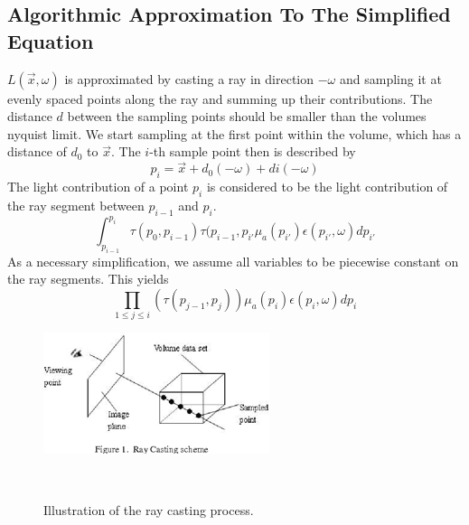 \subsection{Algorithmic Approximation To The Simplified Equation}
$L(\vec{x},\omega )$ is approximated by casting a ray in direction $-\omega$ and sampling it at evenly spaced points along the ray and summing up their contributions. The distance $d$ between the sampling points should be smaller than the volumes nyquist limit.
We start sampling at the first point within the volume, which has a distance of $d_0$ to $\vec{x}$. The $i$-th sample point then is described by
\begin{equation}
p_i=\vec{x} + d_0(-\omega) + di(-\omega)
\end{equation}
The light contribution of a point $p_i$ is considered to be the light contribution of the ray segment between $p_{i-1}$ and $p_i$.
\begin{equation}
\int_{p_{i-1}}^{p_i} \tau (p_0,p_{i-1}) \tau(p_{i-1},p_{i'} \mu_a(p_{i'})\epsilon (p_{i'}, \omega)dp_{i'}
\end{equation} 
As a necessary simplification, we assume all variables to be piecewise constant on the ray segments. This yields
\begin{equation}
 \prod_{1\le j \le i}(\tau(p_{j-1}, p_j)) \mu_a(p_{i})\epsilon (p_{i}, \omega)dp_{i}
\end{equation} 
\begin{figure}[htb]
  \centering
  \includegraphics[width=.8\linewidth]{RayCasting1.png}
  \parbox[t]{.9\columnwidth}{\relax}~\cite{Appa2015RayCF}
  \caption{\label{fig:firstExample}
          Illustration of the ray casting process.}
\end{figure}
